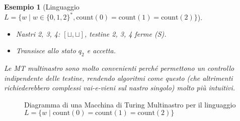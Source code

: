 \documentclass[a4paper]{article}
\newtheorem{example}{Esempio}
\begin{document}
\begin{example}[Linguaggio $L = \{w \mid w \in \{0,1,2\}^*, \text{count}(0)=\text{count}(1)=\text{count}(2)\}$]
\begin{itemize}
\begin{itemize}
\begin{itemize}
                    \item Nastri 2, 3, 4: $[\sqcup, \sqcup]$, testine 2, 3, 4 ferme (S).
                    \item Transisce allo stato $q_2$ e accetta.
                \end{itemize}
        \end{itemize}
\end{itemize}
Le MT multinastro sono molto convenienti perché permettono un controllo indipendente delle testine, rendendo algoritmi come questo (che altrimenti richiederebbero complessi vai-e-vieni sul nastro singolo) molto più intuitivi.
\end{example}

\begin{figure}[h!]
    \centering
    \caption{Diagramma di una Macchina di Turing Multinastro per il linguaggio $L=\{w \mid \text{count}(0)=\text{count}(1)=\text{count}(2)\}$}
\end{figure}
\end{document}
